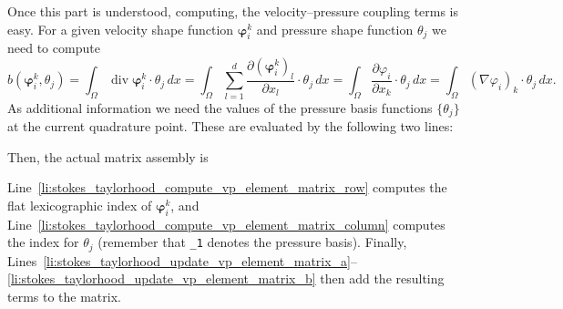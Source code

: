 \documentclass[a4paper,10pt,headings=normal,bibliography=totoc]{scrartcl}
\newcommand{\cpp}[1]{\lstinline[basicstyle=\ttfamily]!#1!}
\begin{document}
Once this part is understood, computing, the velocity--pressure coupling terms is easy.
For a given velocity shape function $\bm{\varphi}_i^k$ and pressure shape function $\theta_j$ we need
to compute
\begin{equation*}
 b(\bm{\varphi}_i^k,\theta_j)
 =
 \int_\Omega \operatorname{div} \bm{\varphi}_i^k \cdot \theta_j\,dx
 =
 \int_\Omega \sum_{l=1}^d \frac{\partial (\bm{\varphi}_i^k)_l}{\partial x_l} \cdot \theta_j\,dx
 =
 \int_\Omega \frac{\partial \varphi_i}{\partial x_k} \cdot \theta_j\,dx
 =
 \int_\Omega (\nabla \varphi_i)_k \cdot \theta_j\,dx.
\end{equation*}
As additional information we need the values of the pressure basis functions $\{\theta_j\}$ at the
current quadrature point.  These are evaluated by the following two lines:
%

%
Then, the actual matrix assembly is
%

%
Line~\ref{li:stokes_taylorhood_compute_vp_element_matrix_row} computes the flat lexicographic index of $\bm{\varphi}_i^k$,
and Line~\ref{li:stokes_taylorhood_compute_vp_element_matrix_column} computes the index for $\theta_j$ (remember that \cpp{_1} denotes
the pressure basis).  Finally, Lines~\ref{li:stokes_taylorhood_update_vp_element_matrix_a}--\ref{li:stokes_taylorhood_update_vp_element_matrix_b}
then add the resulting terms to the matrix.







\end{document}
